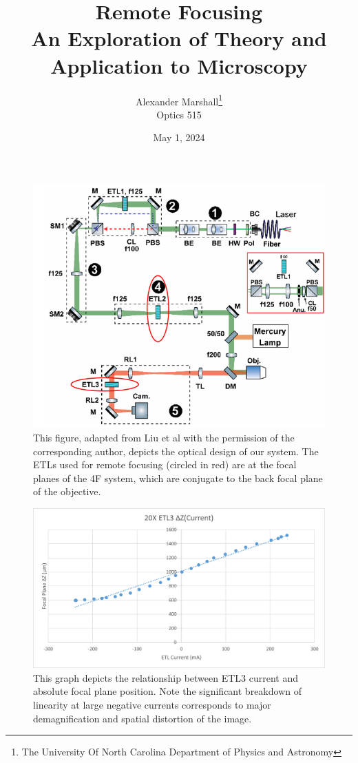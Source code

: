 \documentclass[11pt]{article}
\title{\textbf{\Huge{Remote Focusing}\\ \Large{An Exploration of Theory and Application to Microscopy}}}
\author{\Large{Alexander Marshall\thanks{The University Of North Carolina Department of Physics and Astronomy}}\\\Large{Optics 515}}
\date{\Large{May 1, 2024}}
\begin{document}
\maketitle
\tableofcontents
\newpage
\begin{multicols}{2} %
    
\end{multicols}
\begin{figure}
    \centering
    \includegraphics[scale=.75]{system.png}
    \caption[]{This figure, adapted from Liu et al \cite{Liu} with the permission of the corresponding author, depicts the optical design of our system. The ETLs used for remote focusing (circled in red) are at the focal planes of the 4F system, which are conjugate to the back focal plane of the objective.}
\end{figure}
\begin{figure}
    \centering
    \includegraphics[scale=.75]{20XGraph.png}
    \caption[]{This graph depicts the relationship between ETL3 current and absolute focal plane position. Note the significant breakdown of linearity at large negative currents corresponds to major demagnification and spatial distortion of the image.}
\end{figure}
\end{document}
